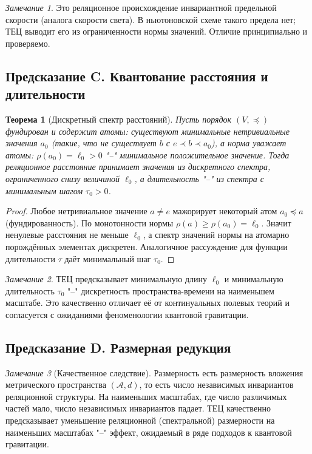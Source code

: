 \documentclass[12pt,a4paper]{article}
\theoremstyle{definition}
\theoremstyle{plain}
\newtheorem{theorem}{Теорема}[section]
\theoremstyle{remark}
\newtheorem{remark}{Замечание}[section]
\newcommand{\Parts}{\mathcal A}
\newcommand{\Values}{V}
\newcommand{\Vord}{\preceq}
\newcommand{\norm}{\rho}
\newcommand{\ide}{e}
\begin{document}
\begin{remark}
Это реляционное происхождение инвариантной предельной скорости (аналога скорости
света). В ньютоновской схеме такого предела нет; ТЕЦ выводит его из ограниченности
нормы значений. Отличие принципиально и проверяемо.
\end{remark}

\subsection{Предсказание C. Квантование расстояния и длительности}

\begin{theorem}[Дискретный спектр расстояний]
Пусть порядок $(\Values,\Vord)$ фундирован и содержит атомы: существуют минимальные
нетривиальные значения $a_0$ (такие, что не существует $b$ с $\ide\prec b\prec a_0$),
а норма уважает атомы: $\norm(a_0)=\ell_0>0$ "--" минимальное положительное значение.
Тогда реляционное расстояние принимает значения из дискретного спектра, ограниченного
снизу величиной $\ell_0$, а длительность "--" из спектра с минимальным шагом $\tau_0>0$.
\end{theorem}

\begin{proof}
Любое нетривиальное значение $a\neq\ide$ мажорирует некоторый атом $a_0\Vord a$
(фундированность). По монотонности нормы $\norm(a)\ge\norm(a_0)=\ell_0$. Значит ненулевые
расстояния не меньше $\ell_0$, а спектр значений нормы на атомарно порождённых
элементах дискретен. Аналогичное рассуждение для функции длительности $\tau$ даёт
минимальный шаг $\tau_0$.
\end{proof}

\begin{remark}
ТЕЦ предсказывает минимальную длину $\ell_0$ и минимальную длительность $\tau_0$ "--"
дискретность пространства-времени на наименьшем масштабе. Это качественно отличает её
от континуальных полевых теорий и согласуется с ожиданиями феноменологии квантовой
гравитации.
\end{remark}

\subsection{Предсказание D. Размерная редукция}

\begin{remark}[Качественное следствие]
Размерность есть размерность вложения метрического пространства $(\Parts,d)$, то есть
число независимых инвариантов реляционной структуры. На наименьших масштабах, где
число различимых частей мало, число независимых инвариантов падает. ТЕЦ качественно
предсказывает уменьшение реляционной (спектральной) размерности на наименьших
масштабах "--" эффект, ожидаемый в ряде подходов к квантовой гравитации.
\end{remark}
\end{document}
